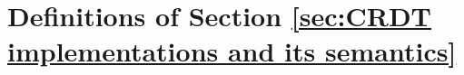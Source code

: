 \section{Definitions of Section \ref{sec:CRDT implementations and its semantics}}
\label{sec:appendix definitions of section CRDT implementations and its semantics}
